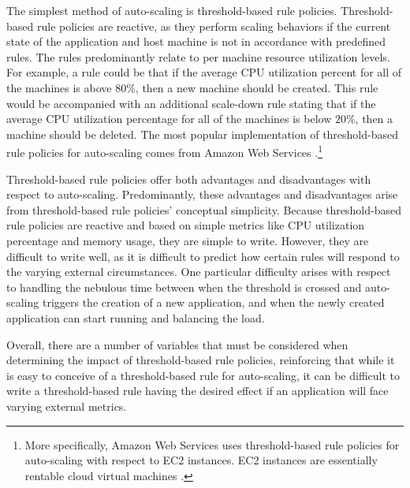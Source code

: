 The simplest method of auto-scaling is threshold-based rule policies.
Threshold-based rule policies are reactive, as they perform scaling behaviors if
the current state of the application and host machine
is not in accordance with predefined rules. The rules
predominantly relate to per machine resource utilization levels. For example, a
rule could be that if the average CPU utilization percent for all of the
machines is above $80\%$, then a new machine should be created. This rule would
be accompanied with an additional scale-down rule stating that if the average
CPU utilization percentage for all of the machines is below $20\%$, then a machine
should be deleted. The most popular implementation of threshold-based rule
policies for auto-scaling comes from Amazon Web Services
\cite{amazon-auto-scaling-developer-guide}.\footnote{More
specifically, Amazon Web Services uses threshold-based rule policies for
auto-scaling with respect to EC2 instances. EC2 instances are essentially
rentable cloud
virtual machines \cite{amazon-ec2}.}

Threshold-based rule policies offer both advantages and disadvantages with
respect to auto-scaling. Predominantly, these advantages and disadvantages arise
from threshold-based rule policies' conceptual simplicity.
Because threshold-based rule policies are reactive and based on simple metrics
like CPU utilization percentage and memory usage, they are simple to write.
However, they are difficult to write well, as it is difficult to predict how
certain rules will respond to the varying external circumstances. One particular
difficulty arises with respect to handling the nebulous time between when the
threshold is crossed and auto-scaling triggers the creation of a new
application, and when the newly created application can start running and
balancing the load.

Overall, there are a number of variables that must be considered when
determining the impact of threshold-based rule policies, reinforcing
that while it is easy to conceive of a threshold-based rule for auto-scaling,
it can be difficult to write a threshold-based rule having the desired effect if
an application will face varying external metrics.

